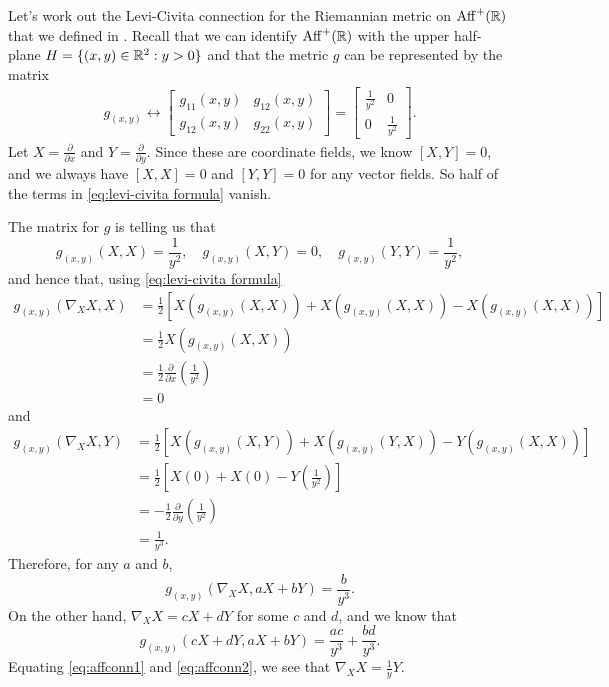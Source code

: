 \begin{example}
	Let's work out the Levi-Civita connection for the Riemannian metric on $\operatorname{Aff}^+(\mathbb{R})$ that we defined in . Recall that we can identify $\operatorname{Aff}^+(\mathbb{R})$ with the upper half-plane $H = \{(x,y) \in \mathbb{R}^2 : y > 0\}$ and that the metric $g$ can be represented by the matrix
	\begin{align*}
		g_{(x,y)} \leftrightarrow \begin{bmatrix} g_{11}(x,y) & g_{12}(x,y) \\ g_{12}(x,y) & g_{22}(x,y) \end{bmatrix} = \begin{bmatrix} \frac{1}{y^2} & 0 \\ 0 & \frac{1}{y^2} \end{bmatrix}.
	\end{align*}
	Let $X = \frac{\partial}{\partial x}$ and $Y = \frac{\partial}{\partial y}$. Since these are coordinate fields, we know $[X,Y] = 0$, and we always have $[X,X] = 0$ and $[Y,Y] = 0$ for any vector fields. So half of the terms in \eqref{eq:levi-civita formula} vanish. 
	
	The matrix for $g$ is telling us that
	\[
		g_{(x,y)}(X,X) = \frac{1}{y^2}, \quad g_{(x,y)}(X,Y) = 0, \quad g_{(x,y)}(Y,Y) = \frac{1}{y^2},
	\]
	and hence that, using \eqref{eq:levi-civita formula}
	\begin{align*}
		g_{(x,y)}(\nabla_X X,X) & = \frac{1}{2}\left[ X(g_{(x,y)}(X,X)) + X(g_{(x,y)}(X,X)) - X(g_{(x,y)}(X,X))\right] \\
		& = \frac{1}{2}X(g_{(x,y)}(X,X)) \\
		& = \frac{1}{2} \frac{\partial}{\partial x}\left(\frac{1}{y^2}\right) \\
		& = 0
	\end{align*}
	and
	\begin{align*}
		g_{(x,y)}(\nabla_X X,Y) & = \frac{1}{2}\left[ X(g_{(x,y)}(X,Y)) + X(g_{(x,y)}(Y,X)) - Y(g_{(x,y)}(X,X))\right] \\
		& = \frac{1}{2}\left[X(0) + X(0) - Y\left(\frac{1}{y^2}\right)\right] \\
		& = -\frac{1}{2} \frac{\partial}{\partial y}\left(\frac{1}{y^2}\right) \\
		& = \frac{1}{y^3}.
	\end{align*}
	Therefore, for any $a$ and $b$,
	\begin{equation}\label{eq:affconn1}
		g_{(x,y)}(\nabla_X X,aX+bY) = \frac{b}{y^3}.
	\end{equation}
	On the other hand, $\nabla_X X = cX+dY$ for some $c$ and $d$, and we know that
	\begin{equation}\label{eq:affconn2}
		g_{(x,y)}(cX+dY,aX+bY) = \frac{ac}{y^3} + \frac{bd}{y^3}.
	\end{equation}
	Equating \eqref{eq:affconn1} and \eqref{eq:affconn2}, we see that $\nabla_XX = \frac{1}{y}Y$.
	

\end{example}
